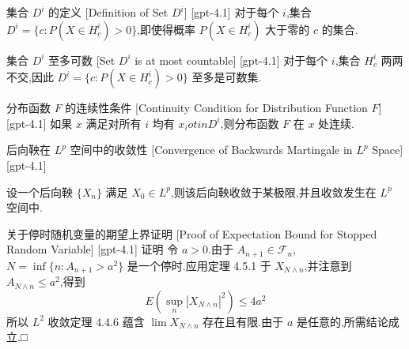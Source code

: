 \documentclass[UTF8]{ctexart}
\begin{document}
    
    
    \begin{dfn}
        {集合 $D^i$ 的定义}
        [Definition of Set $D^i$]
        [gpt-4.1]
        对于每个 $i$,集合 $D^i = \{ c : P( X \in H_c^i ) > 0 \}$,即使得概率 $P( X \in H_c^i )$ 大于零的 $c$ 的集合.
    \end{dfn}
    
    
    
    \begin{ppt}
        {集合 $D^i$ 至多可数}
        [Set $D^i$ is at most countable]
        [gpt-4.1]
        对于每个 $i$,集合 $H_c^i$ 两两不交,因此 $D^i = \{ c : P( X \in H_c^i ) > 0 \}$ 至多是可数集.
    \end{ppt}
    
    
    
    \begin{ppt}
        {分布函数 $F$ 的连续性条件}
        [Continuity Condition for Distribution Function $F$]
        [gpt-4.1]
        如果 $x$ 满足对所有 $i$ 均有 $x_i 
otin D^i$,则分布函数 $F$ 在 $x$ 处连续.
    \end{ppt}
    
    
    
    \begin{thm}
        {后向鞅在 $L^p$ 空间中的收敛性}
        [Convergence of Backwards Martingale in $L^p$ Space]
        [gpt-4.1]
        
设一个后向鞅 $\{X_n\}$ 满足 $X_0 \in L^p$,则该后向鞅收敛于某极限,并且收敛发生在 $L^p$ 空间中.

    \end{thm}
    
    
    
    \begin{prf}
        {关于停时随机变量的期望上界证明}
        [Proof of Expectation Bound for Stopped Random Variable]
        [gpt-4.1]
        证明 令 $a > 0$.由于 $A_{n+1} \in \mathcal{F}_n$,$N = \operatorname*{inf} \{ n : A_{n+1} > a^2 \}$ 是一个停时.应用定理 4.5.1 于 $X_{N \wedge n}$,并注意到 $A_{N \wedge n} \leq a^2$,得到
\[
E \left( \operatorname*{sup}_n | X_{N \wedge n} |^2 \right) \leq 4 a^2
\]
所以 $L^2$ 收敛定理 4.4.6 蕴含 $\lim X_{N \wedge n}$ 存在且有限.由于 $a$ 是任意的,所需结论成立.□

    \end{prf}
    
\end{document}
